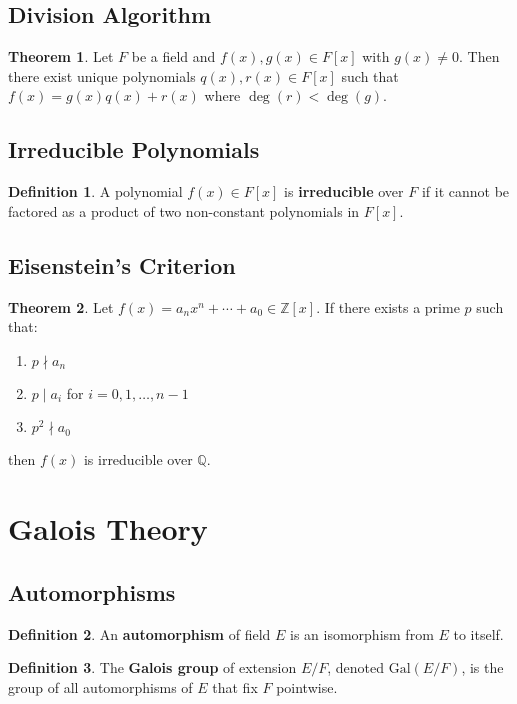 \documentclass[11pt]{article}
\theoremstyle{definition}
\newtheorem{definition}{Definition}[section]
\newtheorem{theorem}{Theorem}[section]
\begin{document}
\subsection{Division Algorithm}
\begin{theorem}
Let $F$ be a field and $f(x), g(x) \in F[x]$ with $g(x) \neq 0$. Then there exist unique polynomials $q(x), r(x) \in F[x]$ such that $f(x) = g(x)q(x) + r(x)$ where $\deg(r) < \deg(g)$.
\end{theorem}

\subsection{Irreducible Polynomials}
\begin{definition}
A polynomial $f(x) \in F[x]$ is \textbf{irreducible} over $F$ if it cannot be factored as a product of two non-constant polynomials in $F[x]$.
\end{definition}

\subsection{Eisenstein's Criterion}
\begin{theorem}
Let $f(x) = a_n x^n + \cdots + a_0 \in \mathbb{Z}[x]$. If there exists a prime $p$ such that:
\begin{enumerate}
    \item $p \nmid a_n$
    \item $p \mid a_i$ for $i = 0, 1, \ldots, n-1$
    \item $p^2 \nmid a_0$
\end{enumerate}
then $f(x)$ is irreducible over $\mathbb{Q}$.
\end{theorem}

\section{Galois Theory}

\subsection{Automorphisms}
\begin{definition}
An \textbf{automorphism} of field $E$ is an isomorphism from $E$ to itself.
\end{definition}

\begin{definition}
The \textbf{Galois group} of extension $E/F$, denoted $\text{Gal}(E/F)$, is the group of all automorphisms of $E$ that fix $F$ pointwise.
\end{definition}
\end{document}
